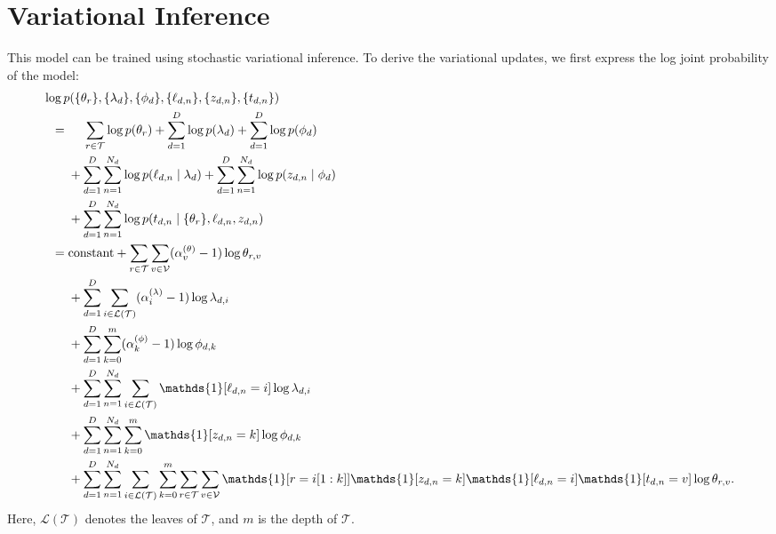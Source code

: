 \documentclass{article}
\newcommand{\indicator}{\mathds{1}}
\begin{document}
\section{Variational Inference}

\newcommand{\rPath}{{r \in \mathcal T}}
\newcommand{\vVocab}{{v \in \mathcal V}}
\newcommand{\iLeaf}{{i \in \mathcal L(\mathcal T)}}
\newcommand{\kDepth}{{k = 0}^{m}}
\newcommand{\kDepthSet}{{k \in \{0, \ldots, m\}}}
\newcommand{\nWordSlot}{{n = 1}^{N_d}}
\newcommand{\dDoc}{{d = 1}^D}
\newcommand{\softmax}{\mathop{\text{softmax}}}

This model can be trained using stochastic variational inference.
To derive the variational updates, we first express the log joint probability of the model:
\begin{align}
\MoveEqLeft
\log p(\{\theta_r\}, \{\lambda_d\}, \{\phi_d\}, \{\ell_{d,n}\}, \{z_{d,n}\}, \{t_{d,n}\}) \\
={}& \phantom{{}+{}} \sum_\rPath \log p(\theta_r) + \sum_\dDoc \log p(\lambda_d) + \sum_\dDoc \log p(\phi_d) \\
&+ \sum_\dDoc \sum_\nWordSlot \log p(\ell_{d,n} \mid \lambda_d) + \sum_\dDoc \sum_\nWordSlot \log p(z_{d,n} \mid \phi_d) \nonumber \\
&+ \sum_\dDoc \sum_\nWordSlot \log p(t_{d,n} \mid \{\theta_r\}, \ell_{d,n}, z_{d,n}) \nonumber \\
={}& \text{constant} + \sum_\rPath \sum_\vVocab (\alpha^{(\theta)}_v - 1) \log \theta_{r,v} \\
&+ \sum_\dDoc \sum_\iLeaf (\alpha^{(\lambda)}_i - 1) \log \lambda_{d,i} \nonumber \\
&+ \sum_\dDoc \sum_\kDepth (\alpha^{(\phi)}_k - 1) \log \phi_{d,k} \nonumber \\
&+ \sum_\dDoc \sum_\nWordSlot \sum_\iLeaf \indicator[\ell_{d,n} = i] \log \lambda_{d,i} \nonumber \\
&+ \sum_\dDoc \sum_\nWordSlot \sum_\kDepth \indicator[z_{d,n} = k] \log \phi_{d,k} \nonumber \\
&+ \sum_\dDoc \sum_\nWordSlot \sum_\iLeaf \sum_\kDepth \sum_\rPath \sum_\vVocab \indicator[r = i[1:k]] \indicator[z_{d,n} = k] \indicator[\ell_{d,n} = i] \indicator[t_{d,n} = v] \log \theta_{r,v}. \nonumber
\end{align}
Here, $\mathcal L(\mathcal T)$ denotes the leaves of $\mathcal T$, and $m$ is the depth of $\mathcal T$.
\end{document}
